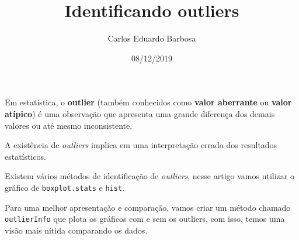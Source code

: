 \documentclass[]{article}
\title{Identificando outliers}
\author{Carlos Eduardo Barbosa}
\date{08/12/2019}
\begin{document}
\maketitle

Em estatística, o \textbf{outlier} (também conhecidos como \textbf{valor
aberrante} ou \textbf{valor atípico}) é uma observação que apresenta uma
grande diferença dos demais valores ou até mesmo inconsistente.

A existência de \emph{outliers} implica em uma interpretação errada dos
resultados estatísticos.

Existem vários métodos de identificação de \emph{outliers}, nesse artigo
vamos utilizar o gráfico de \texttt{boxplot.stats} e \texttt{hist}.

Para uma melhor apresentação e comparação, vamos criar um método chamado
\texttt{outlierInfo} que plota os gráficos com e sem os outliers, com
isso, temos uma visão mais nítida comparando os dados.
\end{document}
